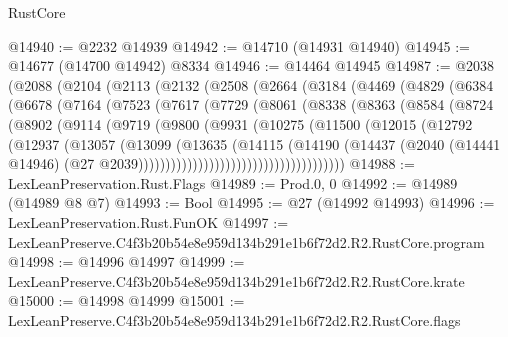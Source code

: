 \begin{lexlean}{RustCore}
\begin{coremodule}
@14940 := @2232 @14939
@14942 := @14710 (@14931 @14940)
@14945 := @14677 (@14700 @14942) @8334
@14946 := @14464 @14945
@14987 := @2038
    (@2088
      (@2104
        (@2113
          (@2132
            (@2508
              (@2664
                (@3184
                  (@4469
                    (@4829
                      (@6384
                        (@6678
                          (@7164
                            (@7523
                              (@7617
                                (@7729
                                  (@8061
                                    (@8338
                                      (@8363
                                        (@8584
                                          (@8724
                                            (@8902
                                              (@9114
                                                (@9719
                                                  (@9800
                                                    (@9931
                                                      (@10275
                                                        (@11500
                                                          (@12015
                                                            (@12792
                                                              (@12937
                                                                (@13057
                                                                  (@13099
                                                                    (@13635
                                                                      (@14115
                                                                        (@14190
                                                                          (@14437
                                                                            (@2040
                                                                              (@14441 @14946)
                                                                              (@27
                                                                                @2039))))))))))))))))))))))))))))))))))))))
@14988 := LexLeanPreservation.Rust.Flags
@14989 := Prod.{0, 0}
@14992 := @14989 (@14989 @8 @7)
@14993 := Bool
@14995 := @27 (@14992 @14993)
@14996 := LexLeanPreservation.Rust.FunOK
@14997 := LexLeanPreserve.C4f3b20b54e8e959d134b291e1b6f72d2.R2.RustCore.program
@14998 := @14996 @14997
@14999 := LexLeanPreserve.C4f3b20b54e8e959d134b291e1b6f72d2.R2.RustCore.krate
@15000 := @14998 @14999
@15001 := LexLeanPreserve.C4f3b20b54e8e959d134b291e1b6f72d2.R2.RustCore.flags

\end{coremodule}
\end{lexlean}
